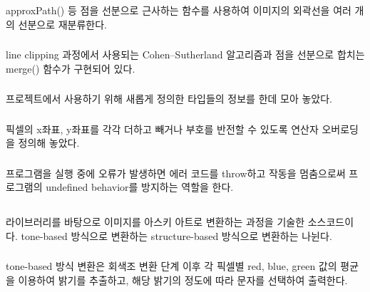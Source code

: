 \documentclass[conference]{IEEEtran}
\begin{document}
\subsubsection{\egTrace}

 approxPath() 등 점을 선분으로 근사하는 함수를 사용하여 이미지의 외곽선을 여러 개의 선분으로 재분류한다.

\subsubsection{\egTool}

 line clipping 과정에서 사용되는 Cohen–Sutherland 알고리즘\cite{cohen-sutherland}과 점을 선분으로 합치는 merge() 함수가 구현되어 있다.

\subsubsection{\egTypes}

 프로젝트에서 사용하기 위해 새롭게 정의한 타입들의 정보를 한데 모아 놓았다.

\subsubsection{\egOperators}

 픽셀의 x좌표, y좌표를 각각 더하고 빼거나 부호를 반전할 수 있도록 연산자 오버로딩을 정의해 놓았다.

\subsubsection{\egExceptions}

 프로그램을 실행 중에 오류가 발생하면 에러 코드를 throw하고 작동을 멈춤으로써 프로그램의 undefined behavior를 방지하는 역할을 한다.

\subsection{\imgascii}

 \eg 라이브러리를 바탕으로 이미지를 아스키 아트로 변환하는 과정을 기술한 소스코드이다.
tone-based 방식으로 변환하는  structure-based 방식으로 변환하는  나뉜다.

\subsubsection{\tone}
tone-based 방식 변환은 회색조 변환 단계 이후 각 픽셀별 red, blue, green 값의 평균을 이용하여 밝기를 추출하고, 해당 밝기의 정도에 따라 문자를 선택하여 출력한다.
\end{document}
